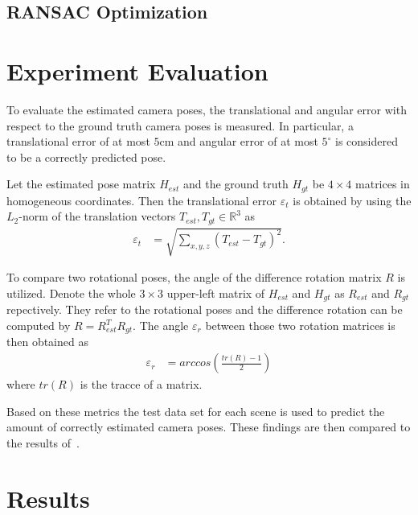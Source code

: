 \documentclass[final]{cvpr}
\begin{document}
\subsection{RANSAC Optimization}

\section{Experiment Evaluation}
To evaluate the estimated camera poses, the translational and angular error with respect to the 
ground truth camera poses is measured. In particular, a translational error of at 
most $5$cm and angular error of at most $5^{\circ}$ is considered to be a correctly predicted pose. 

Let the estimated pose matrix $H_{est}$ and the ground truth $H_{gt}$ be $4 \times 4$ matrices
in homogeneous coordinates. Then the translational error $\varepsilon_t$ is obtained by using the 
$L_2$-norm of the translation vectors $T_{est}, T_{gt} \in \mathbb{R}^3$ as 
\begin{align}
    \varepsilon_t &= \sqrt{\sum_{x,y,z}(T_{est} - T_{gt})^2}.
\end{align}

To compare two rotational poses, the angle of the difference rotation matrix $R$ is utilized. 
Denote the whole $3\times3$ upper-left matrix of $H_{est}$ and $H_{gt}$ as $R_{est}$ and 
$R_{gt}$ repectively. They refer to the rotational poses and the difference rotation can be computed 
by $R = R_{est}^TR_{gt}$. The angle $\varepsilon_r$ between those two rotation matrices is then obtained as
\begin{align}
    \varepsilon_r &= arccos \left( \frac{tr(R)-1}{2} \right)
\end{align}
where $tr(R)$ is the tracce of a matrix.

Based on these metrics the test data set for each scene is used to predict the amount of correctly 
estimated camera poses. These findings are then compared to the results of~\cite{shotton2013}.

\section{Results}


{\small


}
\end{document}
